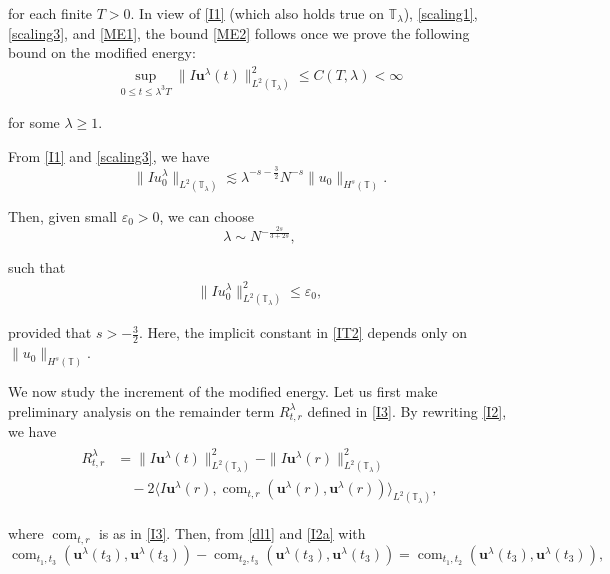 \documentclass[letterpaper, 11pt,  reqno]{amsart}
\DeclareMathOperator{\com}{com}
\newcommand{\1}{\hspace{0.5mm}\text{I}\hspace{0.5mm}}
\newcommand{\noi}{\noindent}
\newcommand{\T}{\mathbb{T}}
\newcommand{\eps}{\varepsilon}
\newcommand{\ld}{\lambda}
\newcommand{\les}{\lesssim}
\newcommand{\uu}{\mathbf{u}}
\numberwithin{equation}{section}
\numberwithin{theorem}{section}
\begin{document}
\noi
for  each finite $T > 0$.
In view of 
 \eqref{I1} (which also holds true on $\T_\ld$), \eqref{scaling1}, \eqref{scaling3}, and \eqref{ME1}, 
the bound \eqref{ME2} follows once we prove the following bound on the modified energy:
\begin{align*}
\sup_{0 \le t \le \ld^3 T} \|I\uu^\ld(t)\|_{L^2(\T_\ld)}^2 \le C(T, \ld ) < \infty
\end{align*}

\noi
for some $\ld \ge 1$.



From \eqref{I1} 
and \eqref{scaling3}, we have 
\begin{equation}
 \| I  u_0^{\ld} \|_{L^2(\T_\ld) }
 \les \ld^{-s-\frac 32} N^{-s} \|  u_0  \|_{H^{s}(\T)}.
 \label{IT1}
\end{equation}


\noi
Then, given small $\eps_0 > 0$, 
we can choose 
\begin{equation}
\ld \sim N^{-\frac{2s}{3+2s}}, 
 \label{IT2}
\end{equation}


\noi
such that 
\begin{align}
\| Iu_0^{\ld} \|^2 _{L^2(\T_\ld)}\le \eps_0, 
\label{IT2a}
\end{align}


\noi
provided that $s > -\frac 32$.
Here, 
 the implicit constant in \eqref{IT2} depends only on ${\| u_0 \|_{H^{s}(\T) }} $.








We now study the increment of the modified energy.
Let us first make preliminary analysis
on the remainder term
 $R^\ld_{t,r}$ defined in \eqref{I3}.
By rewriting \eqref{I2}, we have
\begin{align}
\begin{split}
R^\ld_{t,r} &=  \| I \uu^\ld(t) \|^2_{L^2(\T_\ld)} -  \| I \uu^\ld(r) \|^2_{L^2(\T_\ld)}\\
& \quad 
- 2 \big\langle 
I \uu^\ld(r)  ,   \com_{t, r}(\uu^\ld(r), \uu^\ld(r))
\big\rangle_{L^2(\T_\ld)} , 
\end{split}
\label{I2a}
\end{align}

\noi
where
$\com_{t, r}$ is  as in 
\eqref{I3}.
Then, 
from \eqref{dl1} and \eqref{I2a}
with 
\[  \com_{t_1, t_3}(\uu^\ld(t_3), \uu^\ld(t_3))
-    \com_{t_2, t_3}(\uu^\ld(t_3), \uu^\ld(t_3))
=   \com_{t_1, t_2}(\uu^\ld(t_3), \uu^\ld(t_3)), \]
\end{document}
